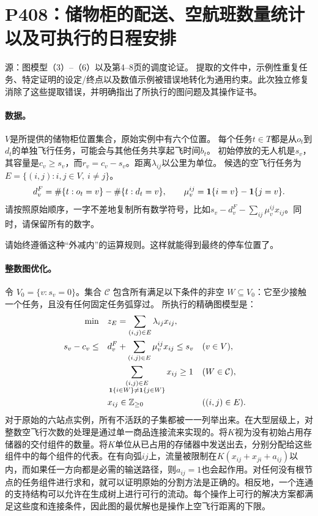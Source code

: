 \documentclass[11pt]{article}
\begin{document}
\section*{P408：储物柜的配送、空航班数量统计以及可执行的日程安排}
源：图模型（3）--（6）以及第4--8页的调度论证。  
提取的文件中，示例性重复任务、特定证明的设定/终点以及数值示例被错误地转化为通用约束。此次独立修复消除了这些提取错误，并明确指出了所执行的图问题及其操作证书。

\paragraph{数据。}
$V$是所提供的储物柜位置集合，原始实例中有六个位置。  
每个任务$t\in T$都是从$o_t$到$d_t$的单独飞行任务，可能会与其他任务共享起飞时间$b_t$。  
初始停放的无人机是$s_v$，其容量是$c_v\ge s_v$，而$r_v=c_v-s_v$。距离$\lambda_{ij}$以公里为单位。  
候选的空飞行任务为$E=\{(i,j):i,j\in V,\ i\ne j\}$。
\[
d_v^F=\#\{t:o_t=v\}-\#\{t:d_t=v\},\qquad
\mu_v^{ij}={\bf1}\{i=v\}-{\bf1}\{j=v\}.
\]
请按照原始顺序，一字不差地复制所有数学符号，比如$s_v-d_v^F-\sum_{ij}\mu_v^{ij}x_{ij}$。同时，请保留所有的数字。

请始终遵循这种“外减内”的运算规则。这样就能得到最终的停车位置了。

\paragraph{整数图优化。}
令 $V_0=\{v:s_v=0\}$。集合 $\mathcal C$ 包含所有满足以下条件的非空 $W\subseteq V_0$：它至少接触一个任务，且没有任何固定任务弧穿过。 所执行的精确图模型是：
\begin{align}
\min\quad & z_E=\sum_{(i,j)\in E}\lambda_{ij}x_{ij},\\
s_v-c_v \le\quad &d_v^F+\sum_{(i,j)\in E}\mu_v^{ij}x_{ij}\le s_v
 &&(v\in V),\\
&\sum_{\substack{(i,j)\in E\\{\bf1}\{i\in W\}\ne{\bf1}\{j\in W\}}}
x_{ij}\ge1 &&(W\in\mathcal C),\\
&x_{ij}\in\mathbb Z_{\ge0} &&((i,j)\in E).
\end{align}
对于原始的六站点实例，所有不活跃的子集都被一一列举出来。在大型层级上，对整数空飞行次数的处理是通过单一商品连接流来实现的。将$K$视为没有初始占用存储器的交付组件的数量。将$K$单位从已占用的存储器中发送出去，分别分配给这些组件中的每个组件的代表。在有向弧$ij$上，流量被限制在$K(x_{ij}+x_{ji}+a_{ij})$以内，而如果任一方向都是必需的输送路径，则$a_{ij}=1$也会起作用。对任何没有根节点的任务组件进行求和，就可以证明原始的分割方法是正确的。相反地，一个连通的支持结构可以允许在生成树上进行可行的流动。每个操作上可行的解决方案都满足这些度和连接条件，因此图的最优解也是操作上空飞行距离的下限。
\end{document}
